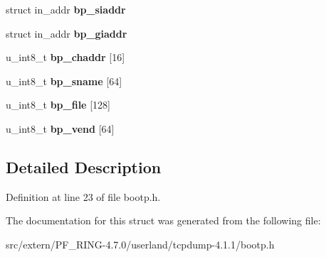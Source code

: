 \begin{DoxyCompactItemize}
\item 
\hypertarget{structbootp_abe31b917c8d04b4ca71703dce44ace44}{
struct in\_\-addr {\bfseries bp\_\-siaddr}}
\label{structbootp_abe31b917c8d04b4ca71703dce44ace44}

\item 
\hypertarget{structbootp_ad72d7a93c9f490cb91adc5f091f1cae2}{
struct in\_\-addr {\bfseries bp\_\-giaddr}}
\label{structbootp_ad72d7a93c9f490cb91adc5f091f1cae2}

\item 
\hypertarget{structbootp_a43a6460a3629f45e7bd5c52265491fbb}{
u\_\-int8\_\-t {\bfseries bp\_\-chaddr} \mbox{[}16\mbox{]}}
\label{structbootp_a43a6460a3629f45e7bd5c52265491fbb}

\item 
\hypertarget{structbootp_a3593fd17300430819e5e90cc607f667e}{
u\_\-int8\_\-t {\bfseries bp\_\-sname} \mbox{[}64\mbox{]}}
\label{structbootp_a3593fd17300430819e5e90cc607f667e}

\item 
\hypertarget{structbootp_ae2f4798876f0be09f12c8e286fa7a9be}{
u\_\-int8\_\-t {\bfseries bp\_\-file} \mbox{[}128\mbox{]}}
\label{structbootp_ae2f4798876f0be09f12c8e286fa7a9be}

\item 
\hypertarget{structbootp_a088b7197554f191299da9a8fb7abd778}{
u\_\-int8\_\-t {\bfseries bp\_\-vend} \mbox{[}64\mbox{]}}
\label{structbootp_a088b7197554f191299da9a8fb7abd778}

\end{DoxyCompactItemize}


\subsection{Detailed Description}


Definition at line 23 of file bootp.h.



The documentation for this struct was generated from the following file:\begin{DoxyCompactItemize}
\item 
src/extern/PF\_\-RING-\/4.7.0/userland/tcpdump-\/4.1.1/bootp.h\end{DoxyCompactItemize}
